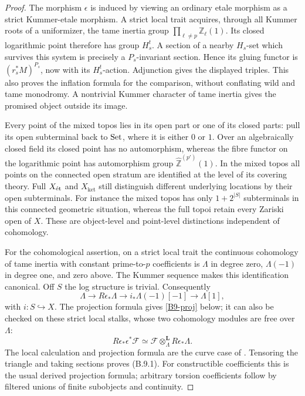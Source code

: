 \begin{proof}
The morphism $\epsilon$ is induced by viewing an ordinary
etale morphism as a strict Kummer-etale morphism. A strict
local trait acquires, through all Kummer roots of a
uniformizer, the tame inertia group
$\prod_{\ell\ne p}\mathbb Z_\ell(1)$. Its closed logarithmic
point therefore has group $H_s^t$. A section of a nearby
$H_s$-set which survives this system is precisely a
$P_s$-invariant section. Hence its gluing functor is
$(r_s^*M)^{P_s}$, now with its $H_s^t$-action. Adjunction gives
the displayed triples. This also proves the inflation formula
for the comparison, without conflating wild and tame
monodromy. A nontrivial Kummer character of tame inertia gives
the promised object outside its image.

Every point of the mixed topos lies in its open part or one
of its closed parts: pull its open subterminal back to
$\mathrm{Set}$, where it is either $0$ or $1$. Over an algebraically
closed field its closed point has no automorphism, whereas
the fibre functor on the logarithmic point has automorphism
group $\widehat{\mathbb Z}^{(p')}(1)$. In the mixed topos all
points on the connected open stratum are identified at the
level of its covering theory. Full $X_{\mathrm{\acute et}}$ and
$X_{\mathrm{ket}}$ still distinguish different underlying
locations by their open subterminals. For instance the mixed
topos has only $1+2^{|S|}$ subterminals in this connected
geometric situation, whereas the full topoi retain every
Zariski open of $X$. These are object-level and point-level
distinctions independent of cohomology.

For the cohomological assertion, on a strict local trait the
continuous cohomology of tame inertia with constant
prime-to-$p$ coefficients is $\Lambda$ in degree zero,
$\Lambda(-1)$ in degree one, and zero above. The Kummer
sequence makes this identification canonical. Off $S$ the
log structure is trivial. Consequently
\[
 \Lambda\longrightarrow R\epsilon_*\Lambda\longrightarrow
 i_*\Lambda(-1)[-1]\longrightarrow\Lambda[1],
\]
with $i:S\hookrightarrow X$. The projection formula gives
\eqref{B9-proj} below; it can also be checked on these strict
local stalks, whose two cohomology modules are free over
$\Lambda$:
\begin{equation}\label{B9-proj}
 R\epsilon_*\epsilon^*\mathcal F
     \simeq\mathcal F\otimes_\Lambda^{\mathbf L}R\epsilon_*\Lambda.
\end{equation}
The local calculation and projection formula are the
curve case of \citet[Theorem~5.2 and \S5.4]{Illusie2002}.
Tensoring the triangle and taking sections proves (B.9.1).
For constructible coefficients this is the usual derived
projection formula; arbitrary torsion coefficients follow
by filtered unions of finite subobjects and continuity.


\end{proof}
